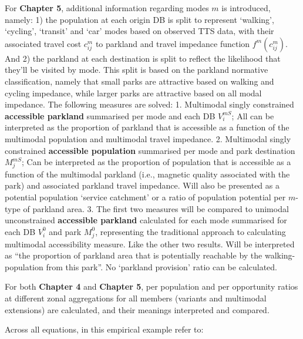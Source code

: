 \documentclass[
11pt, %
oneside, %
english, %
singlespacing, %
]{macthesis} %
\begin{document}
For \textbf{Chapter 5}, additional information regarding modes \(m\) is introduced, namely: 1) the population at each origin DB is split to represent `walking', `cycling', `transit' and `car' modes based on observed TTS data, with their associated travel cost \(c_{ij}^m\) to parkland and travel impedance function \(f^m (c^m_{ij})\). And 2) the parkland at each destination is split to reflect the likelihood that they'll be visited by mode. This split is based on the parkland normative classification, namely that small parks are attractive based on walking and cycling impedance, while larger parks are attractive based on all modal impedance. The following measures are solved:
1. Multimodal singly constrained \textbf{accessible parkland} summarised per mode and each DB \(V_i^{mS}\); All can be interpreted as the proportion of parkland that is accessible as a function of the multimodal population and multimodal travel impedance.
2. Multimodal singly constrained \textbf{accessible population} summarised per mode and park destination \(M_j^{mS}\); Can be interpreted as the proportion of population that is accessible as a function of the multimodal parkland (i.e., magnetic quality associated with the park) and associated parkland travel impedance. Will also be presented as a potential population `service catchment' or a ratio of population potential per \(m\)-type of parkland area.
3. The first two measures will be compared to unimodal unconstrained \textbf{accessible parkland} calculated for each mode summarised for each DB \(V_i^{0}\) and park \(M_j^{0}\), representing the traditional approach to calculating multimodal accessibility measure. Like the other two results. Will be interpreted as ``the proportion of parkland area that is potentially reachable by the walking-population from this park''. No `parkland provision' ratio can be calculated.

For both \textbf{Chapter 4} and \textbf{Chapter 5}, per population and per opportunity ratios at different zonal aggregations for all members (variants and multimodal extensions) are calculated, and their meanings interpreted and compared.

Across all equations, in this empirical example refer to:
\end{document}
